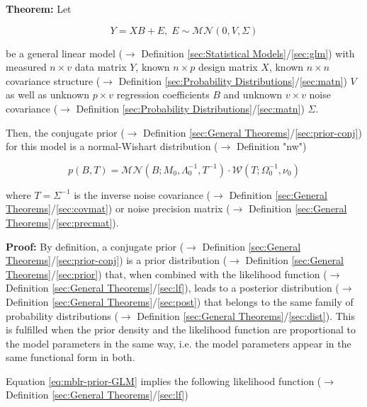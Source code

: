 \documentclass[a4paper,12pt,twoside]{book}
\begin{document}
\textbf{Theorem:} Let

\begin{equation} \label{eq:mblr-prior-GLM}
Y = X B + E, \; E \sim \mathcal{MN}(0, V, \Sigma)
\end{equation}

be a general linear model ($\rightarrow$ Definition \ref{sec:Statistical Models}/\ref{sec:glm}) with measured $n \times v$ data matrix $Y$, known $n \times p$ design matrix $X$, known $n \times n$ covariance structure ($\rightarrow$ Definition \ref{sec:Probability Distributions}/\ref{sec:matn}) $V$ as well as unknown $p \times v$ regression coefficients $B$ and unknown $v \times v$ noise covariance ($\rightarrow$ Definition \ref{sec:Probability Distributions}/\ref{sec:matn}) $\Sigma$.

Then, the conjugate prior ($\rightarrow$ Definition \ref{sec:General Theorems}/\ref{sec:prior-conj}) for this model is a normal-Wishart distribution ($\rightarrow$ Definition "nw")

\begin{equation} \label{eq:mblr-prior-GLM-NW-prior}
p(B,T) = \mathcal{MN}(B; M_0, \Lambda_0^{-1}, T^{-1}) \cdot \mathcal{W}(T; \Omega_0^{-1}, \nu_0)
\end{equation}

where $T = \Sigma^{-1}$ is the inverse noise covariance ($\rightarrow$ Definition \ref{sec:General Theorems}/\ref{sec:covmat}) or noise precision matrix ($\rightarrow$ Definition \ref{sec:General Theorems}/\ref{sec:precmat}).


\vspace{1em}
\textbf{Proof:} By definition, a conjugate prior ($\rightarrow$ Definition \ref{sec:General Theorems}/\ref{sec:prior-conj}) is a prior distribution ($\rightarrow$ Definition \ref{sec:General Theorems}/\ref{sec:prior}) that, when combined with the likelihood function ($\rightarrow$ Definition \ref{sec:General Theorems}/\ref{sec:lf}), leads to a posterior distribution ($\rightarrow$ Definition \ref{sec:General Theorems}/\ref{sec:post}) that belongs to the same family of probability distributions ($\rightarrow$ Definition \ref{sec:General Theorems}/\ref{sec:dist}). This is fulfilled when the prior density and the likelihood function are proportional to the model parameters in the same way, i.e. the model parameters appear in the same functional form in both.

Equation \eqref{eq:mblr-prior-GLM} implies the following likelihood function ($\rightarrow$ Definition \ref{sec:General Theorems}/\ref{sec:lf})
\end{document}
